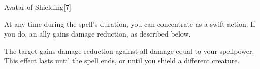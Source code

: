 \begin{spellsection}{Avatar of Shielding}[7]
    \begin{spellheader}
    \end{spellheader}
    \begin{spellcontent}
        \begin{spelltargetinginfo}
        \end{spelltargetinginfo}
        \begin{spelleffects}
            \spelleffect At any time during the spell's duration, you can concentrate as a swift action. If you do, an ally gains damage reduction, as described below.
            \spelldur \durlong
        \end{spelleffects}
    \end{spellcontent}
    \begin{spellsubcontent}
        \begin{spelltargetinginfo}
        \end{spelltargetinginfo}
        \begin{spelleffects}
            \spelleffect The target gains damage reduction against all damage equal to your spellpower. This effect lasts until the spell ends, or until you shield a different creature.
        \end{spelleffects}
    \end{spellsubcontent}
    \begin{spellfooter}
        \miscastexplode
    \end{spellfooter}
    \begin{spellaugments}
    \end{spellaugments}
\end{spellsection}

